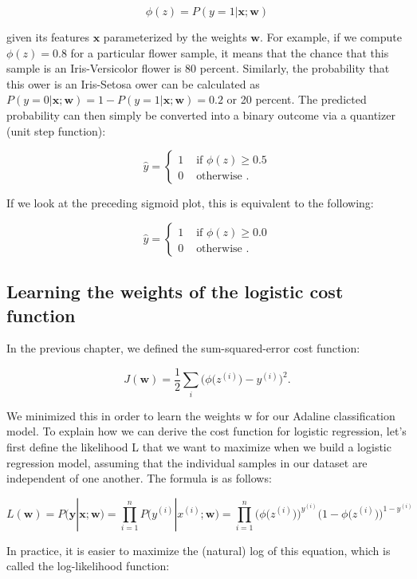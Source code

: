\documentclass[letterpaper]{report}
\begin{document}
\[
\phi(z) = P(y=1 | \mathbf{x}; \mathbf{w})
\]

given its features $\mathbf{x}$ parameterized by the weights $\mathbf{w}$. For example, if we compute $\phi(z) = 0.8$ for a particular flower sample, it means that the chance that this sample is an Iris-Versicolor flower is 80 percent. Similarly, the probability that this  ower is an Iris-Setosa  ower can be calculated as $P(y=0 | \mathbf{x};\mathbf{w})=1 - P (y=1 | \mathbf{x}; \mathbf{w}) = 0.2$ or 20 percent. The predicted probability can then simply be converted into a binary outcome via a quantizer (unit step function):

\[ \hat{y}= \begin{cases} 
      1 & \text{ if } \phi(z) \ge 0.5 \\
      0 & \text{ otherwise }.
   \end{cases}
\]

If we look at the preceding sigmoid plot, this is equivalent to the following:

\[ \hat{y}= \begin{cases} 
      1 & \text{ if } \phi(z) \ge 0.0 \\
      0 & \text{ otherwise }.
   \end{cases}
\]

\subsection{Learning the weights of the logistic cost function}

In the previous chapter, we defined the sum-squared-error cost function: 

\[
J(\mathbf{w}) = \frac{1}{2} \sum_i \bigg( \phi \big( z^{(i)} \big) - y^{(i)}  \bigg)^2.
\]

We minimized this in order to learn the weights w for our Adaline classification model. To explain how we can derive the cost function for logistic regression, let's  first define the likelihood L that we want to maximize when we build a logistic regression model, assuming that the individual samples in our dataset are independent of one another. The formula is as follows:

\[
L(\mathbf{w}) = P(\mathbf{y} | \mathbf{x}; \mathbf{w}) = \prod_{i=1}^{n} P \big( y^{(i)} | x^{(i)}; \mathbf{w} \big) =  \prod_{i=1}^{n} \bigg( \phi \big(z^{(i)} \big) \bigg) ^ {y^{(i)}} \bigg( 1 - \phi \big( z^{(i)} \big) \bigg)^{1-y^{(i)}}
\]

In practice, it is easier to maximize the (natural) log of this equation, which is called
the log-likelihood function:
\end{document}
